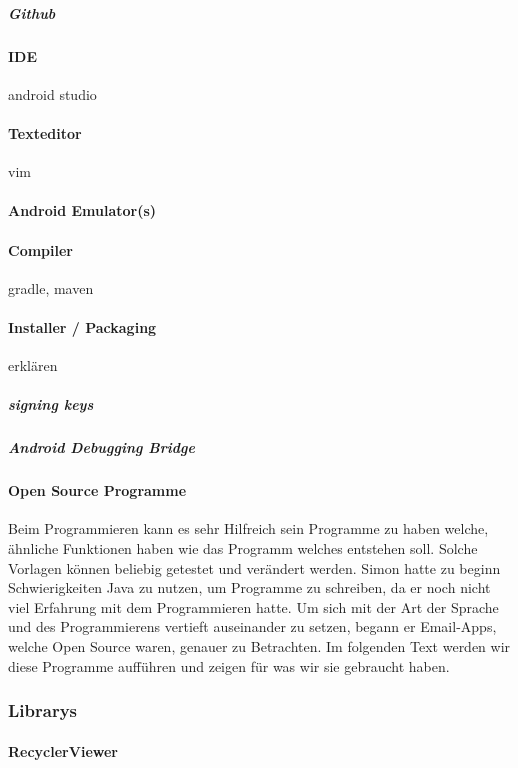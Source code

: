 \documentclass[a4paper,11pt]{article}
\begin{document}
\subparagraph{Github}

\paragraph{IDE}
android studio
\paragraph{Texteditor}
vim

\paragraph{Android Emulator(s)}

\paragraph{Compiler}
gradle, maven

\paragraph{Installer / Packaging}
erklären

\subparagraph{signing keys}
\subparagraph{Android Debugging Bridge}


\paragraph{Open Source Programme}

Beim Programmieren kann es sehr Hilfreich sein Programme zu haben welche, ähnliche Funktionen haben wie das Programm welches entstehen soll. 
Solche Vorlagen können beliebig getestet und verändert werden. Simon hatte zu beginn Schwierigkeiten Java zu nutzen, um Programme zu schreiben, da er noch nicht viel 
Erfahrung mit dem Programmieren hatte. Um sich mit der Art der Sprache und des Programmierens vertieft auseinander zu setzen, begann er Email-Apps, welche Open Source
waren, genauer zu Betrachten. Im folgenden Text werden wir diese Programme aufführen und zeigen für was wir sie gebraucht haben. 

\subsubsection{Librarys}

\paragraph{RecyclerViewer}
\end{document}
